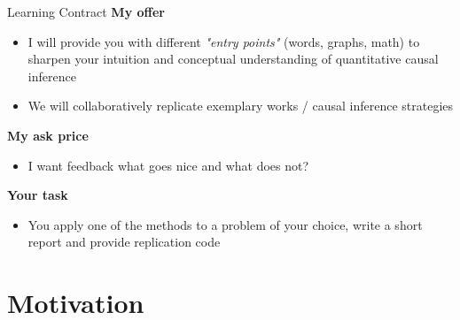 \documentclass[aspectratio=169]{beamer}
\begin{document}

	\begin{frame}{Learning Contract}
		\textbf{My offer}
		\begin{itemize}
			\item I will provide you with different \textit{"entry points"} (words, graphs, math) to sharpen your intuition and conceptual understanding of quantitative causal inference
			\item We will collaboratively replicate exemplary works / causal inference strategies
		\end{itemize}
		\vspace*{.25cm}
		\textbf{My ask price}
		\begin{itemize}
			\item I want feedback what goes nice and what does not?
		\end{itemize}
		\vspace*{.25cm}
		\textbf{Your task}
		\begin{itemize}
			\item You apply one of the methods to a problem of your choice, write a short report and provide replication code
		\end{itemize}
	\end{frame}


\section{Motivation}



\end{document}
